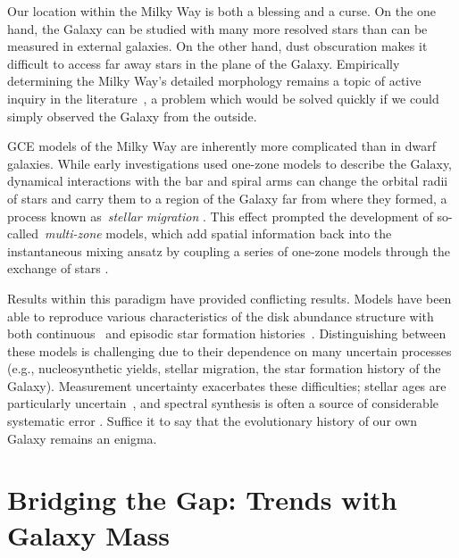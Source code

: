 \documentclass[main.tex]{subfiles}
\begin{document}
\begin{doublespace}
Our location within the Milky Way is both a blessing and a curse.
On the one hand, the Galaxy can be studied with many more resolved stars than
can be measured in external galaxies.
On the other hand, dust obscuration makes it difficult to access far away stars
in the plane of the Galaxy.
Empirically determining the Milky Way's detailed morphology remains a topic of
active inquiry in the literature~\citep[e.g.,][]{Nataf2013, Bovy2019,
Shen2020}, a problem which would be solved quickly if we could simply observed
the Galaxy from the outside.
\par
GCE models of the Milky Way are inherently more complicated than in dwarf
galaxies.
While early investigations used one-zone models to describe the Galaxy,
dynamical interactions with the bar and spiral arms can change the orbital
radii of stars and carry them to a region of the Galaxy far from where they
formed, a process known as~\textit{stellar migration}
\citep[e.g.,][]{Sellwood2002, Schoenrich2009a}.
This effect prompted the development of so-called~\textit{multi-zone} models,
which add spatial information back into the instantaneous mixing ansatz by
coupling a series of one-zone models through the exchange of stars
\citep[e.g.,][]{Matteucci1989, Wyse1989, Prantzos1995}.
\par
Results within this paradigm have provided conflicting results.
Models have been able to reproduce various characteristics of the disk abundance
structure with both continuous~\citep[e.g.,][]{Chen2023} and episodic star
formation histories~\citep[e.g.,][]{Spitoni2021}.
Distinguishing between these models is challenging due to their dependence on
many uncertain processes (e.g., nucleosynthetic yields, stellar migration, the
star formation history of the Galaxy).
Measurement uncertainty exacerbates these difficulties; stellar ages are
particularly uncertain~\citep[e.g.,][]{Soderblom2010, Chaplin2013}, and
spectral synthesis is often a source of considerable systematic error
\citep[e.g.,][]{Joensson2018, Eilers2022}.
Suffice it to say that the evolutionary history of our own Galaxy remains an
enigma.

\section{Bridging the Gap: Trends with Galaxy Mass}
\label{main:sec:inro:snrates}


\end{doublespace}
\end{document}
